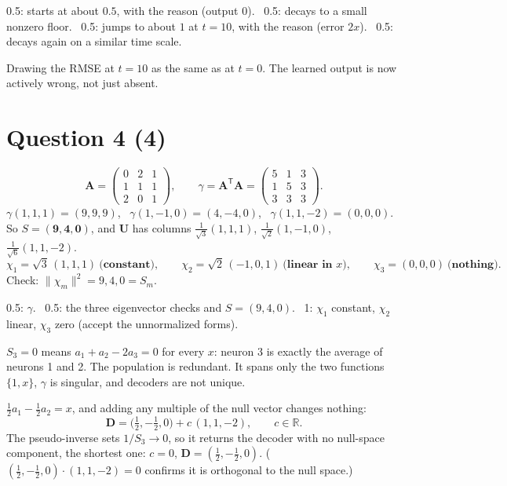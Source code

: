 \documentclass[11pt,letterpaper]{article}
\newcommand{\T}{\mathsf{T}}
\newcommand{\ans}[1]{\par\vspace{4pt}{\bfseries #1}\quad}
\begin{document}
\begin{marking}
0.5: starts at about $0.5$, with the reason (output $0$). \ 0.5: decays to a small nonzero floor. \ 0.5: jumps to about $1$ at $t = 10$, with the reason (error $2x$). \ 0.5: decays again on a similar time scale.
\end{marking}
\begin{trap}
Drawing the RMSE at $t = 10$ as the same as at $t = 0$. The learned output is now actively wrong, not just absent.
\end{trap}

\section*{Question 4 \hfill (4)}

\ans{(a) [2]}
\[
\mathbf A = \begin{pmatrix} 0 & 2 & 1 \\ 1 & 1 & 1 \\ 2 & 0 & 1 \end{pmatrix}, \qquad
\gamma = \mathbf A^\T\mathbf A = \begin{pmatrix} 5 & 1 & 3 \\ 1 & 5 & 3 \\ 3 & 3 & 3 \end{pmatrix}.
\]
$\gamma(1, 1, 1) = (9, 9, 9)$, \ $\gamma(1, -1, 0) = (4, -4, 0)$, \ $\gamma(1, 1, -2) = (0, 0, 0)$. So $S = (\mathbf{9, 4, 0})$, and $\mathbf U$ has columns $\tfrac{1}{\sqrt3}(1, 1, 1)$, $\tfrac{1}{\sqrt2}(1, -1, 0)$, $\tfrac{1}{\sqrt6}(1, 1, -2)$.
\[
\chi_1 = \sqrt3\,(1, 1, 1)\ \textbf{(constant)}, \qquad \chi_2 = \sqrt2\,(-1, 0, 1)\ \textbf{(linear in } x\textbf{)}, \qquad \chi_3 = (0, 0, 0)\ \textbf{(nothing)}.
\]
Check: $\|\chi_m\|^2 = 9, 4, 0 = S_m$.
\begin{marking}
0.5: $\gamma$. \ 0.5: the three eigenvector checks and $S = (9, 4, 0)$. \ 1: $\chi_1$ constant, $\chi_2$ linear, $\chi_3$ zero (accept the unnormalized forms).
\end{marking}

\ans{(b) [2]}
$S_3 = 0$ means $a_1 + a_2 - 2a_3 = 0$ for every $x$: neuron 3 is exactly the average of neurons 1 and 2. The population is redundant. It spans only the two functions $\{1, x\}$, $\gamma$ is singular, and decoders are not unique.

$\tfrac12 a_1 - \tfrac12 a_2 = x$, and adding any multiple of the null vector changes nothing:
\[
\mathbf D = \bigl(\tfrac12, -\tfrac12, 0\bigr) + c\,(1, 1, -2), \qquad c \in \mathbb R.
\]
The pseudo-inverse sets $1/S_3 \to 0$, so it returns the decoder with no null-space component, the shortest one: $c = 0$, $\mathbf D = (\tfrac12, -\tfrac12, 0)$. ($(\tfrac12, -\tfrac12, 0)\cdot(1, 1, -2) = 0$ confirms it is orthogonal to the null space.)
\end{document}
